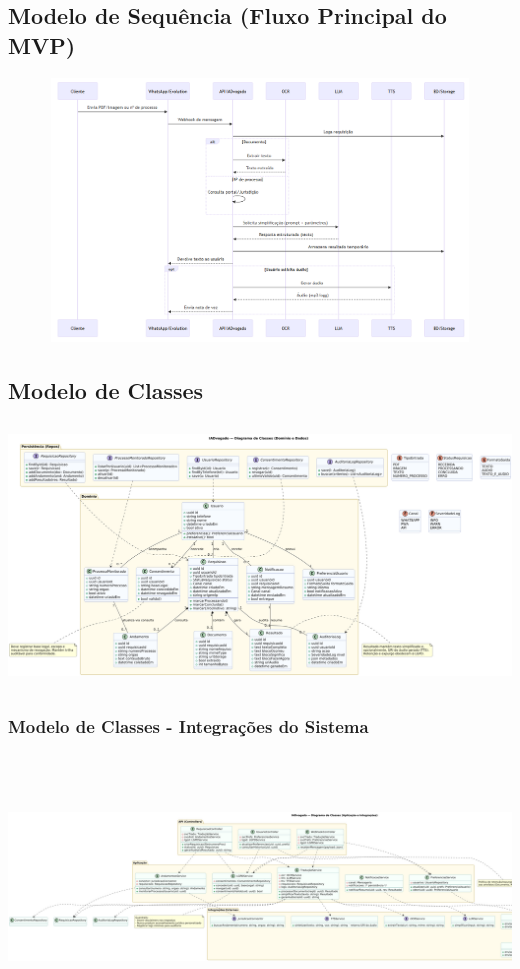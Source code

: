 \documentclass{article}
\begin{document}
\subsection{Modelo de Sequência (Fluxo Principal do MVP)}
\includegraphics[width=9\textwidth,height=7cm,keepaspectratio]{images/488839370-73a99421-2751-4901-8dad-6b8227931d8f.png}

\subsection{Modelo de Classes}
\includegraphics[width=9\textwidth,height=7cm,keepaspectratio]{images/488859339-e96e68b8-5b16-4772-ad8f-b181fcb76a5d.png}
\subsubsection{Modelo de Classes - Integrações do Sistema}
\includegraphics[width=1.3\textwidth,height=7cm,keepaspectratio]{images/488860207-8dae7c6e-94d9-4128-88ce-490bab98ead1.png}
\end{document}
